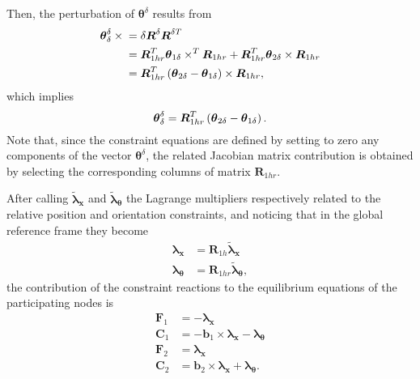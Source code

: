\documentclass[10pt,dvips,fleqn,subeqn]{report}
\newcommand{\T}[1]{\boldsymbol{#1}}
\begin{document}
Then, the perturbation of $\T{\theta}^{\delta}$ results from
\begin{align}
	\T{\theta}^{\delta}_{\delta} \times{}
	&= \delta\T{R}^{\delta} \T{R}^{\delta T} \nonumber \\
	&= \T{R}_{1hr}^T \T{\theta}_{1\delta}\times^T \T{R}_{1hr}
	+ \T{R}_{1hr}^T \T{\theta}_{2\delta}\times \T{R}_{1hr} \nonumber \\
	&= \T{R}_{1hr}^T \plbr{
		\T{\theta}_{2\delta} - \T{\theta}_{1\delta}
	} \times \T{R}_{1hr} ,
\end{align}
which implies
\begin{equation}
	\T{\theta}^{\delta}_{\delta} = \T{R}_{1hr}^T \plbr{
		\T{\theta}_{2\delta} - \T{\theta}_{1\delta}
	} .
\end{equation}
Note that, since the constraint equations are defined by setting 
to zero any components of the vector $\T{\theta}^{\delta}$, the
related Jacobian matrix contribution is obtained by selecting 
the corresponding columns of matrix $\T{R}_{1hr}$.


After calling $\tilde{\T{\lambda}}_{\T{x}}$
and $\tilde{\T{\lambda}}_{\T{\theta}}$ the Lagrange multipliers
respectively related to the relative position and orientation
constraints, and noticing that in the global reference frame
they become
\begin{align}
	\T{\lambda}_{\T{x}} &= \T{R}_{1h} \tilde{\T{\lambda}}_{\T{x}} \\
	\T{\lambda}_{\T{\theta}} &= \T{R}_{1hr} \tilde{\T{\lambda}}_{\T{\theta}} ,
\end{align}
the contribution of the constraint reactions to the equilibrium equations
of the participating nodes is
\begin{align}
	\T{F}_1 &= - \T{\lambda}_{\T{x}} \\
	\T{C}_1 &= - \T{b}_1 \times \T{\lambda}_{\T{x}} - \T{\lambda}_{\T{\theta}} \\
	\T{F}_2 &= \T{\lambda}_{\T{x}} \\
	\T{C}_2 &= \T{b}_2 \times \T{\lambda}_{\T{x}} + \T{\lambda}_{\T{\theta}} .
\end{align}
\end{document}
